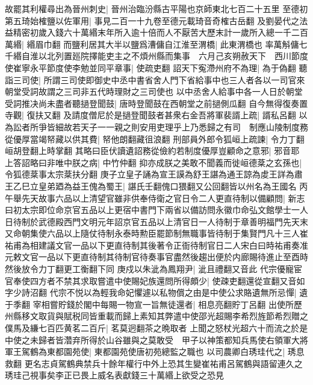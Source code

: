 故罷其利權尋出為晉州刺史|{
	晉州治臨汾縣古平陽也京師東北七百二十五里}
至德初第五琦始榷鹽以佐軍用|{
	事見二百一十九卷至德元載琦音奇榷古岳翻}
及劉晏代之法益精密初歲入錢六十萬緡末年所入逾十倍而人不厭苦大歷末計一歲所入總一千二百萬緡|{
	緡眉巾翻}
而鹽利居其大半以鹽爲漕傭自江淮至渭橋|{
	此東渭橋也}
率萬斛傭七千緡自淮以北列置廵院擇能吏主之不煩州縣而集事　六月己亥朔赦天下　西川節度使崔寧永平節度使李勉並同平章事|{
	使疏吏翻}
詔天下寃滯州府不為理|{
	為于偽翻}
聽詣三司使|{
	所謂三司使即御史中丞中書省舍人門下省給事中也三人者各以一司官來朝堂受詞故謂之三司非五代時理財之三司使也}
以中丞舍人給事中各一人日於朝堂受詞推决尚未盡者聽撾登聞鼓|{
	唐時登聞鼓在西朝堂之前撾側瓜翻}
自今無得復奏置寺觀|{
	復扶又翻}
及請度僧尼於是撾登聞鼓者甚衆右金吾將軍裴諝上疏|{
	諝私呂翻}
以為訟者所爭皆細故若天子一一親之則安用吏理乎上乃悉歸之有司　制應山陵制度務從優厚當竭帑藏以供其費|{
	帑他朗翻藏徂浪翻}
刑部員外郎令狐峘上疏諫|{
	令力丁翻峘胡登翻上時掌翻}
其略曰臣伏讀遺詔務從儉約若制度優厚豈顧命之意邪|{
	邪音耶}
上答詔略曰非唯中朕之病|{
	中竹仲翻}
抑亦成朕之美敢不聞義而徙峘德棻之玄孫也|{
	令狐德棻事太宗棻扶分翻}
庚子立皇子誦為宣王謨為舒王諶為通王諒為䖍王詳為肅王乙巳立皇弟廼為益王傀為蜀王|{
	諶氏壬翻傀口猥翻又公回翻皆以州名為王國名}
丙午舉先天故事六品以上清望官雖非供奉侍衛之官日令二人更直待制以備顧問|{
	新志曰初太宗即位命京官五品以上更宿中書門下兩省以備訪問永徽巾命弘文館學士一人日待制於武德殿西門文明元年詔京官五品以上清官日一人待制于章善明福門先天末又命朝集使六品以上隨仗待制永泰時勲臣罷節制無職事皆待制于集賢門凡十三人崔祐甫為相建議文官一品以下更直待制其後著令正衙待制官日二人宋白曰時祐甫奏准元敕文官一品以下更直待制其待制官待奏事官盡然後趨出便於内廊賜待進止至酉時然後放令力丁翻更工衡翻下同}
庚戍以朱泚為鳳翔尹|{
	泚且禮翻又音此}
代宗優寵宦官奉使四方者不禁其求取嘗遣中使賜妃族還問所得頗少|{
	使疎吏翻還從宣翻又音如字少詩沼翻}
代宗不悦以為輕我命妃懼遽以私物償之由是中使公求賂遺無所忌憚|{
	遺于季翻}
宰相嘗貯錢於閣中每賜一物宣一旨無徒還者|{
	相息亮翻貯丁呂翻}
出使所歷州縣移文取貨與賦税同皆重載而歸上素知其弊遣中使邵光超賜李希烈旌節希烈贈之僕馬及縑七百匹黄茗二百斤|{
	茗莫迥翻茶之晩取者}
上聞之怒杖光超六十而流之於是中使之未歸者皆濳弃所得於山谷雖與之莫敢受　甲子以神策都知兵馬使右領軍大將軍王駕鶴為東都園苑使|{
	東都園苑使唐初苑總監之職也}
以司農卿白琇珪代之|{
	琇息救翻}
更名志貞駕鶴典禁兵十餘年權行中外上恐其生變崔祐甫呂駕鶴與語留連久之琇珪己視事矣李正已畏上威名表獻錢三十萬緡上欲受之恐見

